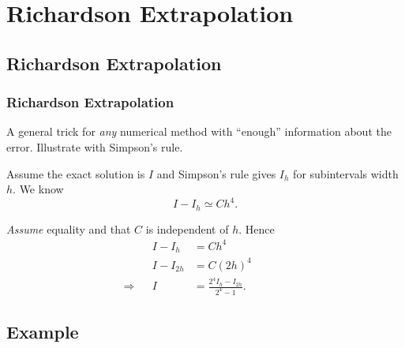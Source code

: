 \documentclass{beamer}
\begin{document}
\section{Richardson Extrapolation}

\subsection{Richardson Extrapolation}

\begin{frame}
  \frametitle{Richardson Extrapolation}

  A general trick for \emph{any} numerical method with ``enough''
  information about the error. Illustrate with Simpson's rule. \pause

  \vspace{1ex}

  Assume the exact solution is $I$ and Simpson's rule gives $I_h$ for
  subintervals width $h$. We know
  \begin{equation*}
    I - I_h \simeq C h^4.
  \end{equation*} \pause

  \emph{Assume} equality and that $C$ is independent of $h$. Hence
  \begin{align*}
    && I - I_h &= C h^4 &&&&\\
    && I - I_{2 h} &= C (2 h)^4 &&&&\\
    \Rightarrow && I  &= \frac{2^4 I_h - I_{2 h}}{2^4 - 1}.&&&&
  \end{align*}

\end{frame}


\subsection{Example}
\end{document}
